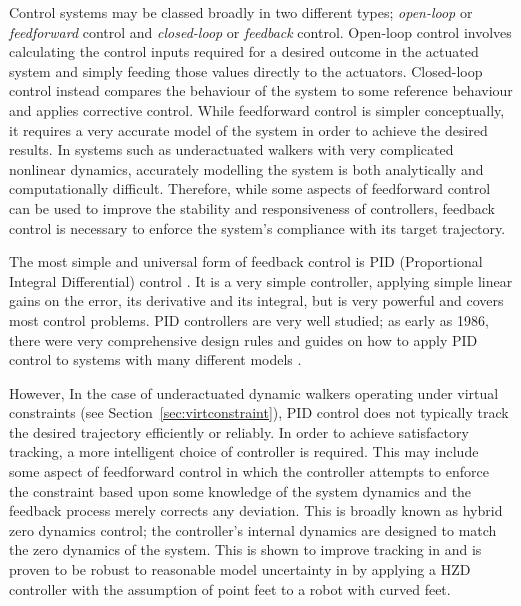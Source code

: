 Control systems may be classed broadly in two different types; \textit{open-loop} or \textit{feedforward} control and \textit{closed-loop} or \textit{feedback} control. Open-loop control involves calculating the control inputs required for a desired outcome in the actuated system and simply feeding those values directly to the actuators. Closed-loop control instead compares the behaviour of the system to some reference behaviour and applies corrective control. While feedforward control is simpler conceptually, it requires a very accurate model of the system in order to achieve the desired results. In systems such as underactuated walkers with very complicated nonlinear dynamics, accurately modelling the system is both analytically and computationally difficult. Therefore, while some aspects of feedforward control can be used to improve the stability and responsiveness of controllers, feedback control is necessary to enforce the system's compliance with its target trajectory.

The most simple and universal form of feedback control is PID (Proportional Integral Differential) control \cite{aastrom2001future}. It is a very simple controller, applying simple linear gains on the error, its derivative and its integral, but is very powerful and covers most control problems. PID controllers are very well studied; as early as 1986, there were very comprehensive design rules and guides on how to apply PID control to systems with many different models \cite{rivera1986internal}. 

However, In the case of underactuated dynamic walkers operating under virtual constraints (see Section~\ref{sec:virtconstraint}), PID control does not typically track the desired trajectory efficiently or reliably. In order to achieve satisfactory tracking, a more intelligent choice of controller is required. This may include some aspect of feedforward control in which the controller attempts to enforce the constraint based upon some knowledge of the system dynamics and the feedback process merely corrects any deviation. This is broadly known as hybrid zero dynamics control; the controller's internal dynamics are designed to match the zero dynamics of the system. This is shown to improve tracking in \cite{sreenath2011compliant} and is proven to be robust to reasonable model uncertainty in \cite{martin2014design} by applying a HZD controller with the assumption of point feet to a robot with curved feet. 

